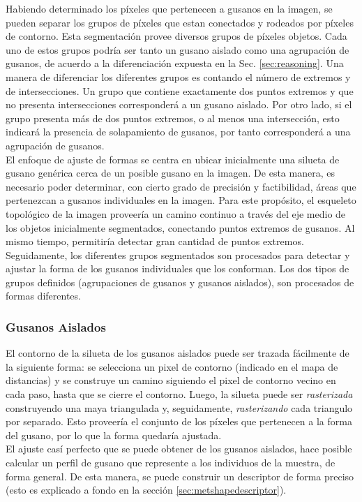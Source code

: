 Habiendo determinado los p\'ixeles que pertenecen a gusanos en la imagen, se pueden separar
los grupos de p\'ixeles que estan conectados y rodeados por p\'ixeles de contorno. Esta
segmentaci\'on provee diversos grupos de p\'ixeles objetos. Cada uno de estos grupos
podr\'ia ser tanto un gusano aislado como una agrupaci\'on de gusanos, de acuerdo a la diferenciaci\'on
expuesta en la Sec. \ref{sec:reasoning}.
Una manera de diferenciar los diferentes grupos es contando el n\'umero de extremos y de intersecciones. 
Un grupo que contiene exactamente dos puntos extremos y que
no presenta intersecciones corresponder\'a a un gusano aislado. Por otro lado, si el grupo presenta
m\'as de dos puntos extremos, o al menos una intersecci\'on, esto indicar\'a la presencia de 
solapamiento de gusanos, por tanto corresponder\'a a una agrupaci\'on de gusanos.\\

El enfoque de ajuste de formas se centra en ubicar inicialmente una silueta de gusano gen\'erica 
cerca de un posible gusano en la imagen. De esta manera, es necesario poder determinar, con cierto grado
de precisi\'on y factibilidad, \'areas que pertenezcan a gusanos individuales en la imagen. Para este prop\'osito,
el esqueleto topol\'ogico de la imagen proveer\'ia un camino continuo a trav\'es del eje medio
de los objetos inicialmente segmentados, conectando puntos extremos de gusanos. Al mismo tiempo, permitir\'ia
detectar gran cantidad de puntos extremos.\\

Seguidamente, los diferentes grupos segmentados son procesados para detectar 
y ajustar la forma de los gusanos individuales que los conforman.
Los dos tipos de grupos definidos (agrupaciones de gusanos y gusanos aislados),
son procesados de formas diferentes. 

\subsubsection*{Gusanos Aislados}
El contorno de la silueta de los gusanos aislados puede ser trazada f\'acilmente de 
la siguiente forma: se selecciona un pixel de contorno (indicado en el mapa de distancias)
y se construye un camino siguiendo el pixel de contorno vecino en cada paso, hasta que
se cierre el contorno. Luego, la silueta puede ser \emph{rasterizada} construyendo 
una maya triangulada y, seguidamente, \emph{rasterizando} cada triangulo por separado. Esto
proveer\'ia el conjunto de los p\'ixeles que pertenecen a la forma del gusano, por lo que
la forma quedar\'ia ajustada.\\
El ajuste cas\'i perfecto que se puede obtener de los gusanos aislados, hace posible
calcular un perfil de gusano que represente a los individuos de la muestra, de forma
general. De esta manera, se puede construir un descriptor de forma preciso (esto 
es explicado a fondo en la secci\'on \ref{sec:metshapedescriptor}).


